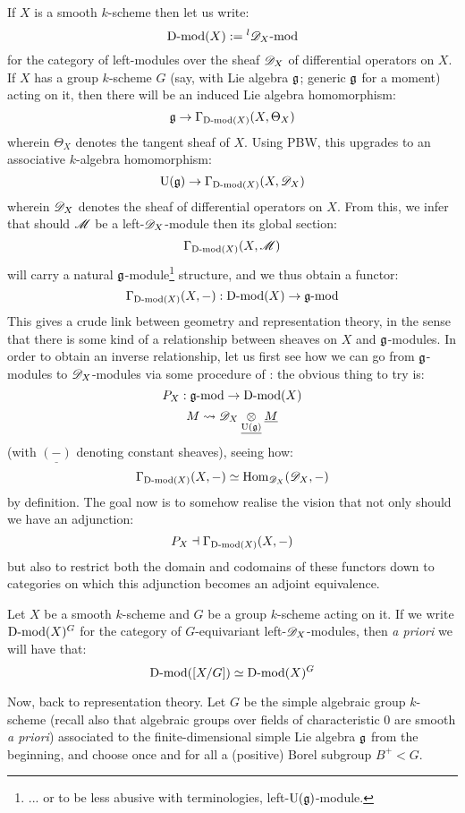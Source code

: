         If $X$ is a smooth $k$-scheme then let us write:
            $$\mathrm{D}\text{-}\mathrm{mod}(X) := {}^l\mathscr{D}_X\text{-}\mathrm{mod}$$
        for the category of left-modules over the sheaf $\mathscr{D}_X$ of differential operators on $X$. If $X$ has a group $k$-scheme $G$ (say, with Lie algebra $\mathfrak{g}$; generic $\mathfrak{g}$ for a moment) acting on it, then there will be an induced Lie algebra homomorphism:
            $$\mathfrak{g} \to \Gamma_{\mathrm{D}\text{-}\mathrm{mod}(X)}(X, \Theta_X)$$
        wherein $\Theta_X$ denotes the tangent sheaf of $X$. Using PBW, this upgrades to an associative $k$-algebra homomorphism:
            $$\mathrm{U}(\mathfrak{g}) \to \Gamma_{\mathrm{D}\text{-}\mathrm{mod}(X)}(X, \mathscr{D}_X)$$
        wherein $\mathscr{D}_X$ denotes the sheaf of differential operators on $X$. From this, we infer that should $\mathscr{M}$ be a left-$\mathscr{D}_X$-module then its global section:
            $$\Gamma_{\mathrm{D}\text{-}\mathrm{mod}(X)}(X, \mathscr{M})$$
        will carry a natural $\mathfrak{g}$-module\footnote{... or to be less abusive with terminologies, left-$\mathrm{U}(\mathfrak{g})$-module.} structure, and we thus obtain a functor:
            $$\Gamma_{\mathrm{D}\text{-}\mathrm{mod}(X)}(X, -): \mathrm{D}\text{-}\mathrm{mod}(X) \to \mathfrak{g}\text{-}\mathrm{mod}$$
        This gives a crude link between geometry and representation theory, in the sense that there is some kind of a relationship between sheaves on $X$ and $\mathfrak{g}$-modules. In order to obtain an inverse relationship, let us first see how we can go from $\mathfrak{g}$-modules to $\mathscr{D}_X$-modules via some procedure of : the obvious thing to try is:
            $$P_X: \mathfrak{g}\text{-}\mathrm{mod} \to \mathrm{D}\text{-}\mathrm{mod}(X)$$
            $$M \mapsto \scrD_X \tensor_{\underline{\rmU(\g)}} \underline{M}$$
        (with $\underline{(-)}$ denoting constant sheaves), seeing how:
            $$\Gamma_{\mathrm{D}\text{-}\mathrm{mod}(X)}(X, -) \simeq \mathrm{Hom}_{\mathscr{D}_X}(\mathscr{D}_X, -)$$
        by definition. The goal now is to somehow realise the vision that not only should we have an adjunction:
            $$P_X \dashv \Gamma_{\mathrm{D}\text{-}\mathrm{mod}(X)}(X, -)$$
        but also to restrict both the domain and codomains of these functors down to categories on which this adjunction becomes an adjoint equivalence.

        Let $X$ be a smooth $k$-scheme and $G$ be a group $k$-scheme acting on it. If we write $\mathrm{D}\text{-}\mathrm{mod}(X)^G$ for the category of $G$-equivariant left-$\mathscr{D}_X$-modules, then \textit{a priori} we will have that:
            $$\mathrm{D}\text{-}\mathrm{mod}([X/G]) \simeq \mathrm{D}\text{-}\mathrm{mod}(X)^G$$ 

        Now, back to representation theory. Let $G$ be the simple algebraic group $k$-scheme (recall also that algebraic groups over fields of characteristic $0$ are smooth \textit{a priori}) associated to the finite-dimensional simple Lie algebra $\mathfrak{g}$ from the beginning, and choose once and for all a (positive) Borel subgroup $B^+ < G$. 
    
    \printbibliography


